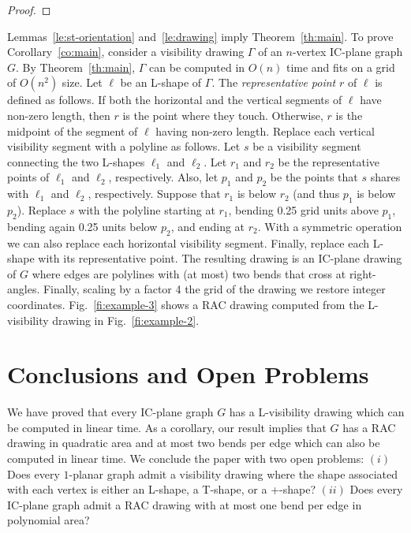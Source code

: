 \documentclass[a4paper]{article}
\begin{document}
\begin{proof}
\end{proof}

Lemmas~\ref{le:st-orientation} and~\ref{le:drawing} imply Theorem~\ref{th:main}. To prove Corollary~\ref{co:main}, consider a visibility drawing $\Gamma$ of an $n$-vertex IC-plane graph $G$. By Theorem~\ref{th:main}, $\Gamma$ can be computed in $O(n)$ time and fits on a grid of $O(n^2)$ size. Let $\ell$ be an L-shape of $\Gamma$. The \emph{representative point} $r$ of $\ell$ is defined as follows. If both the horizontal and the vertical segments of $\ell$ have non-zero length, then $r$ is the point where they touch. Otherwise, $r$ is the midpoint of the segment of $\ell$  having non-zero length. Replace each vertical visibility segment with a polyline as follows. Let $s$ be a visibility segment connecting the two L-shapes $\ell_1$ and $\ell_2$. Let $r_1$ and $r_2$ be the representative points of $\ell_1$ and $\ell_2$, respectively.  Also, let $p_1$ and $p_2$ be the points that $s$ shares with $\ell_1$ and $\ell_2$, respectively. Suppose that $r_1$ is below $r_2$ (and thus $p_1$ is below $p_2$). Replace $s$ with the polyline starting at $r_1$, bending 0.25 grid units above $p_1$, bending again 0.25 units below $p_2$, and ending at $r_2$. With a symmetric operation we can also replace each horizontal visibility segment. Finally, replace each L-shape with its representative point. The resulting drawing is an IC-plane drawing of $G$ where edges are polylines with (at most) two bends that cross at right-angles. Finally, scaling by a factor 4 the grid of the drawing we restore integer coordinates. Fig.~\ref{fi:example-3} shows a RAC drawing computed from the L-visibility drawing in Fig.~\ref{fi:example-2}.

\section{Conclusions and Open Problems}\label{se:conclusions}
We have proved that every IC-plane graph $G$ has a L-visibility drawing which can be computed in linear time. As a corollary, our result implies that $G$ has a RAC drawing in quadratic area and at most two bends per edge which can also be computed in linear time. We conclude the paper with two open problems: $(i)$ Does every $1$-planar graph admit a visibility drawing where the shape associated with each vertex is either an L-shape, a T-shape, or a +-shape? $(ii)$ Does every IC-plane graph admit a RAC drawing with at most one bend per edge in polynomial area?










{\small }

\end{document}
